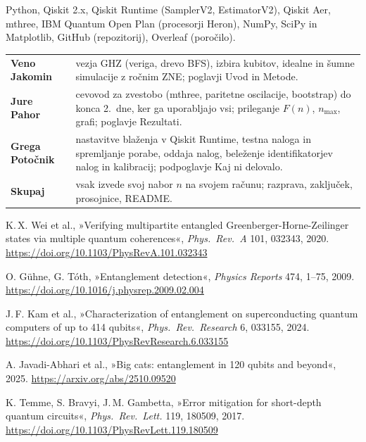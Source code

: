 \documentclass[10pt,a4paper]{article}
\newcommand{\sect}[1]{\par\vspace{4pt}{\normalsize\bfseries #1}\par\vspace{1pt}}
\newcommand{\nmax}{n_{\mathrm{max}}}
\begin{document}
\sect{Orodja}
Python, Qiskit 2.x, Qiskit Runtime (SamplerV2, EstimatorV2), Qiskit Aer, mthree, IBM Quantum Open Plan (procesorji Heron), NumPy, SciPy in Matplotlib, GitHub (repozitorij), Overleaf (poročilo).

\sect{Razdelitev dela}
\begin{tabularx}{\textwidth}{@{}>{\bfseries}l X@{}}
\toprule
Veno Jakomin & vezja GHZ (veriga, drevo BFS), izbira kubitov, idealne in šumne simulacije z ročnim ZNE; poglavji Uvod in Metode. \\
Jure Pahor & cevovod za zvestobo (mthree, paritetne oscilacije, bootstrap) do konca 2.\ dne, ker ga uporabljajo vsi; prileganje $F(n)$, $\nmax$, grafi; poglavje Rezultati. \\
Grega Potočnik & nastavitve blaženja v Qiskit Runtime, testna naloga in spremljanje porabe, oddaja nalog, beleženje identifikatorjev nalog in kalibracij; podpoglavje Kaj ni delovalo. \\
Skupaj & vsak izvede svoj nabor $n$ na svojem računu; razprava, zaključek, prosojnice, README. \\
\bottomrule
\end{tabularx}

\sect{Literatura}
{\footnotesize
\begin{enumerate}[label={[\arabic*]}]
\item K.\,X. Wei et al., »Verifying multipartite entangled Greenberger-Horne-Zeilinger states via multiple quantum coherences«, \emph{Phys.\ Rev.\ A} 101, 032343, 2020. \url{https://doi.org/10.1103/PhysRevA.101.032343}
\item O. Gühne, G. Tóth, »Entanglement detection«, \emph{Physics Reports} 474, 1--75, 2009. \url{https://doi.org/10.1016/j.physrep.2009.02.004}
\item J.\,F. Kam et al., »Characterization of entanglement on superconducting quantum computers of up to 414 qubits«, \emph{Phys.\ Rev.\ Research} 6, 033155, 2024. \url{https://doi.org/10.1103/PhysRevResearch.6.033155}
\item A. Javadi-Abhari et al., »Big cats: entanglement in 120 qubits and beyond«, 2025. \url{https://arxiv.org/abs/2510.09520}
\item K. Temme, S. Bravyi, J.\,M. Gambetta, »Error mitigation for short-depth quantum circuits«, \emph{Phys.\ Rev.\ Lett.} 119, 180509, 2017. \url{https://doi.org/10.1103/PhysRevLett.119.180509}
\end{enumerate}
}
\end{document}
